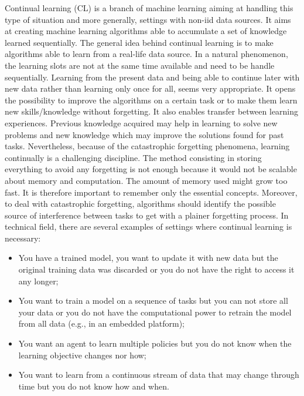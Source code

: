 \documentclass[english, LaM, oneside]{sapthesis}%
\begin{document}
\newline \newline
Continual learning (CL) is a branch of machine learning aiming at handling this type of situation and more generally, settings with non-iid data sources. It aims at creating machine learning algorithms able to accumulate a set of knowledge learned sequentially. The general idea behind continual learning is to make algorithms able to learn from a real-life data source. In a natural phenomenon, the learning slots are not at the same time available and need to be handle sequentially. Learning from the present data and being able to continue later with new data rather than learning only once for all, seems very appropriate. It opens the possibility to improve the algorithms on a certain task or to make them learn new skills/knowledge without forgetting. It also enables transfer between learning experiences. Previous knowledge acquired may help in learning to solve new problems and new knowledge which may improve the solutions found for past tasks. Nevertheless, because of the catastrophic forgetting phenomena, learning continually is a challenging discipline. The method consisting in storing everything to avoid any forgetting is not enough because it would not be scalable about memory and computation. The amount of memory used might grow too fast. It is therefore important to remember only the essential concepts. Moreover, to deal with catastrophic forgetting, algorithms should identify the possible source of interference between tasks to get with a plainer forgetting process.
\newline \newline
In technical field, there are several examples of settings where continual learning is necessary:
\begin{itemize}
\item You have a trained model, you want to update it with new data but the original training data was discarded or you do not have the right to access it any longer;
\item You want to train a model on a sequence of tasks but you can not store all your data or you do not have the computational power to retrain the model from all data (e.g., in an embedded platform);
\item You want an agent to learn multiple policies but you do not know when the learning objective changes nor how;
\item You want to learn from a continuous stream of data that may change through time but you do not know how and when.
\end{itemize}
\end{document}
